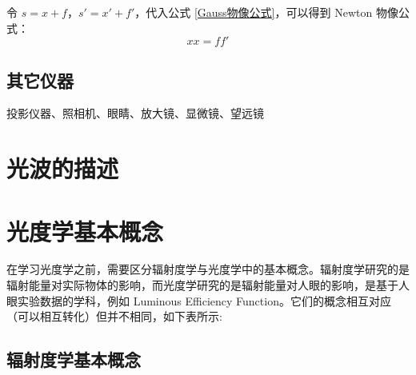 \documentclass[UTF8]{report}
\theoremstyle{MyLineTheoremStyle} %
\theoremstyle{MyBlockTheoremStyle} %
\theoremstyle{MySubsubsectionStyle} %
\begin{document}
令 $s = x + f$，$s' = x' + f'$，代入公式 \ref{Gauss物像公式}，可以得到 Newton 物像公式：
\begin{equation}
xx = ff'
\end{equation}


\subsection{其它仪器}
投影仪器、照相机、眼睛、放大镜、显微镜、望远镜

\section{光波的描述}
\section{光度学基本概念}

在学习光度学之前，需要区分辐射度学与光度学中的基本概念。辐射度学研究的是辐射能量对实际物体的影响，而光度学研究的是辐射能量对人眼的影响，是基于人眼实验数据的学科，例如 Luminous Efficiency Function。它们的概念相互对应（可以相互转化）但并不相同，如下表所示: 
\begin{table}[H]\centering
    \caption{\textbf{光度学与辐射度学概念对应关系}}
    \label{光度学与辐射度学概念对应关系}
\end{table}



\subsection{辐射度学基本概念}
\end{document}
